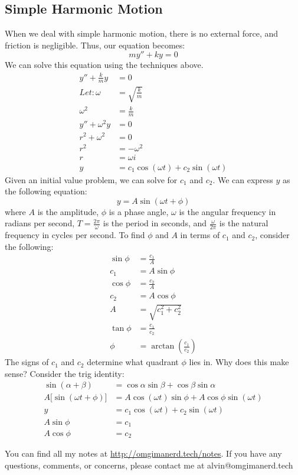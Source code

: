 \documentclass{math}
\begin{document}
\subsection*{Simple Harmonic Motion}
When we deal with simple harmonic motion, there is no external force, and
friction is negligible. Thus, our equation becomes:
\[ my''+ky = 0 \]
We can solve this equation using the techniques above.
\begin{align*}
  y''+\frac{k}{m}y &= 0 \\
  Let: \omega &= \sqrt{\frac{k}{m}} \\
  \omega^2 &= \frac{k}{m} \\
  y''+\omega^2y &= 0 \\
  r^2+\omega^2 &= 0 \\
  r^2 &= -\omega^2 \\
  r &= \omega i \\
  y &= c_1\cos(\omega t)+c_2\sin(\omega t)
\end{align*}
Given an initial value problem, we can solve for \( c_1 \) and \( c_2 \). We can
express \( y \) as the following equation:
\[ y = A\sin(\omega t+\phi) \]
where \( A \) is the amplitude, \( \phi \) is a phase angle, \( \omega \) is
the angular frequency in radians per second, \( T = \frac{2\pi}{\omega} \) is
the period in seconds, and \( \frac{\omega}{2\pi} \) is the natural frequency
in cycles per second. To find \( \phi \) and \( A \) in terms of \( c_1 \) and
\( c_2 \), consider the following:
\begin{align*}
  \sin\phi &= \frac{c_1}{A} \\
  c_1 &= A\sin\phi \\
  \cos\phi &= \frac{c_2}{A} \\
  c_2 &= A\cos\phi \\
  A &= \sqrt{c_1^2+c_2^2} \\
  \tan\phi &= \frac{c_1}{c_2} \\
  \phi &= \arctan(\frac{c_1}{c_2})
\end{align*}
The signs of \( c_1 \) and \( c_2 \) determine what quadrant \( \phi \) lies in.
Why does this make sense? Consider the trig identity:
\begin{align*}
  \sin(\alpha+\beta) &= \cos\alpha\sin\beta+\cos\beta\sin\alpha \\
  A\bigg[\sin(\omega t+\phi)\bigg] &=
    A\cos(\omega t)\sin\phi+A\cos\phi\sin(\omega t) \\
  y &= c_1\cos(\omega t)+c_2\sin(\omega t) \\
  A\sin\phi &= c_1 \\
  A\cos\phi &= c_2
\end{align*}

\begin{center}
  You can find all my notes at \url{http://omgimanerd.tech/notes}. If you have
  any questions, comments, or concerns, please contact me at
  alvin@omgimanerd.tech
\end{center}
\end{document}
